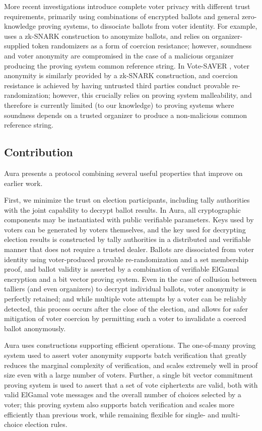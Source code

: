 \documentclass{article}
\begin{document}
More recent investigations introduce complete voter privacy with different trust requirements, primarily using combinations of encrypted ballots and general zero-knowledge proving systems, to dissociate ballots from voter identity.
For example, \cite{dimitriou} uses a zk-SNARK construction to anonymize ballots, and relies on organizer-supplied token randomizers as a form of coercion resistance; however, soundness and voter anonymity are compromised in the case of a malicious organizer producing the proving system common reference string.
In Vote-SAVER \cite{saver}, voter anonymity is similarly provided by a zk-SNARK construction, and coercion resistance is achieved by having untrusted third parties conduct provable re-randomization; however, this crucially relies on proving system malleability, and therefore is currently limited (to our knowledge) to proving systems where soundness depends on a trusted organizer to produce a non-malicious common reference string.


\subsection{Contribution}

Aura presents a protocol combining several useful properties that improve on earlier work.

First, we minimize the trust on election participants, including tally authorities with the joint capability to decrypt ballot results.
In Aura, all cryptographic components may be instantiated with public verifiable parameters.
Keys used by voters can be generated by voters themselves, and the key used for decrypting election results is constructed by tally authorities in a distributed and verifiable manner that does not require a trusted dealer.
Ballots are dissociated from voter identity using voter-produced provable re-randomization and a set membership proof, and ballot validity is asserted by a combination of verifiable ElGamal encryption and a bit vector proving system.
Even in the case of collusion between talliers (and even organizers) to decrypt individual ballots, voter anonymity is perfectly retained; and while multiple vote attempts by a voter can be reliably detected, this process occurs after the close of the election, and allows for safer mitigation of voter coercion by permitting such a voter to invalidate a coerced ballot anonymously.

Aura uses constructions supporting efficient operations.
The one-of-many proving system used to assert voter anonymity supports batch verification that greatly reduces the marginal complexity of verification, and scales extremely well in proof size even with a large number of voters.
Further, a single bit vector commitment proving system is used to assert that a set of vote ciphertexts are valid, both with valid ElGamal vote messages and the overall number of choices selected by a voter; this proving system also supports batch verification and scales more efficiently than previous work, while remaining flexible for single- and multi-choice election rules.
\end{document}
